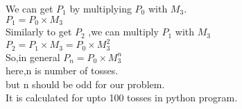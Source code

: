 \documentclass[journel,12pt,twocoloums]{IEEEtran}
\begin{document}
We can get $P_1$ by multiplying $P_0$ with $M_3$.\\
$P_1=P_0 \times M_3$\\
Similarly to get $P_2$ ,we can multiply $P_1$ with $M_3$\\
$P_2=P_1 \times M_3= P_0 \times M_3^2$\\
So,in general $P_n=P_0 \times M_3^n$\\
here,n is number of tosses.\\
but n should be odd for our problem.\\
It is calculated for upto 100 tosses in python program.\\
\end{document}
